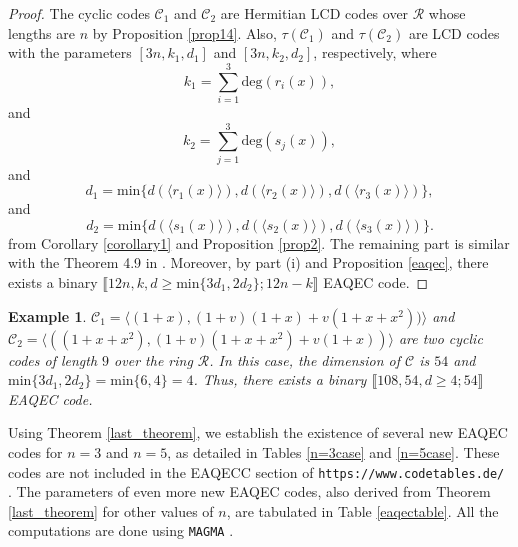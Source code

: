 \documentclass[pdflatex,sn-mathphys-num]{sn-jnl}%
\theoremstyle{thmstyleone}%
\theoremstyle{thmstyletwo}%
\newtheorem{example}{Example}%
\theoremstyle{thmstylethree}%
\begin{document}
\begin{proof}
The cyclic codes $\mathcal{C}_1$ and $\mathcal{C}_2$ are Hermitian LCD codes over $\mathcal{R}$ whose lengths are $n$ by Proposition \ref{prop14}. Also, $\tau(\mathcal{C}_1)$ and $\tau(\mathcal{C}_2)$ are LCD codes with the parameters $[3n,k_1,d_1]$ and $[3n,k_2,d_2]$, respectively, where
\begin{equation*}
   k_1 = {{\overset{3}{\underset{i=1} {{\displaystyle\sum}}}}}\mathrm{deg}(r_i(x)),
\end{equation*}
and
\begin{equation*}
   k_2 = {{\overset{3}{\underset{j=1} {{\displaystyle\sum}}}}}\mathrm{deg}(s_j(x)),
\end{equation*}
and
\begin{equation*}
d_1=\mathrm{min}\{d(\langle r_1(x)\rangle),d(\langle r_2(x)\rangle),d(\langle r_3(x)\rangle)\},
\end{equation*}
and
\begin{equation*}
d_2=\mathrm{min}\{d(\langle s_1(x)\rangle),d(\langle s_2(x)\rangle),d(\langle s_3(x)\rangle)\}.
\end{equation*}
from Corollary \ref{corollary1} and Proposition \ref{prop2}. The remaining part is similar with the Theorem 4.9 in \cite{euclideansum}. Moreover, by part (i) and Proposition \ref{eaqec}, there exists a binary $\llbracket 12n,k,d\geq \mathrm{min}\{3d_1,2d_2\};12n-k\rrbracket$ EAQEC code.
\end{proof}

\begin{example}
$\mathcal{C}_{1}=\langle (1+x),(1+v)(1+x)+v(1+x+x^2))\rangle $ and
$\mathcal{C}_{2}=\langle ((1+x+x^2),(1+v)(1+x+x^2)+v(1+x))\rangle $ are two
cyclic codes of length $9$ over the ring $\mathcal{R}$. In this case, the dimension of $\mathcal{C}$ is $54$ and $\mathrm{min}\{3d_1,2d_2\}=\mathrm{min}\{6,4\}=4$. Thus, there exists a binary $\llbracket 108,54,d\geq 4;54\rrbracket$ EAQEC code.
\end{example}

Using Theorem \ref{last_theorem}, we establish the existence of several new EAQEC codes for $n=3$ and $n=5$, as detailed in Tables \ref{n=3case} and \ref{n=5case}. These codes are not included in the EAQECC section of \texttt{https://www.codetables.de/} \cite{Grassl:codetables}. The parameters of even more new EAQEC codes, also derived from Theorem \ref{last_theorem} for other values of $n$, are tabulated in Table \ref{eaqectable}. All the computations are done using \verb"MAGMA" \cite{bosma1997magma}.
\end{document}
